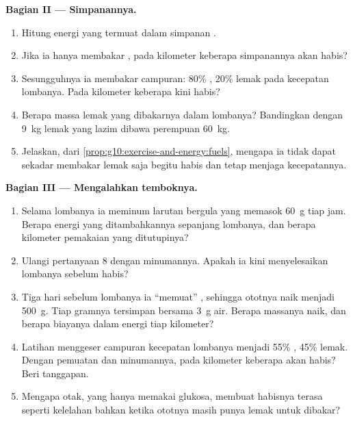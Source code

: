 \begin{problem}
\medskip
\noindent\textbf{Bagian II --- Simpanannya.}
\begin{enumerate}[resume]
  \item Hitung energi yang termuat dalam simpanan .
  \item Jika ia hanya membakar , pada kilometer keberapa
        simpanannya akan habis?
  \item Sesungguhnya ia membakar campuran: 80\% , 20\% lemak
        pada kecepatan lombanya. Pada kilometer keberapa 
        kini habis?
  \item Berapa massa lemak yang dibakarnya dalam lombanya? Bandingkan
        dengan \qty{9}{kg} lemak yang lazim dibawa perempuan \qty{60}{kg}.
  \item Jelaskan, dari \cref{prop:g10:exercise-and-energy:fuels},
        mengapa ia tidak dapat sekadar membakar lemak saja begitu
         habis dan tetap menjaga kecepatannya.
\end{enumerate}

\medskip
\noindent\textbf{Bagian III --- Mengalahkan temboknya.}
\begin{enumerate}[resume]
  \item Selama lombanya ia meminum larutan bergula yang memasok
        \qty{60}{g}  tiap jam. Berapa energi yang
        ditambahkannya sepanjang lombanya, dan berapa kilometer
        pemakaian  yang ditutupinya?
  \item Ulangi pertanyaan 8 dengan minumannya. Apakah ia kini
        menyelesaikan lombanya sebelum  habis?
  \item Tiga hari sebelum lombanya ia ``memuat'' , sehingga
         ototnya naik menjadi \qty{500}{g}. Tiap gramnya
        tersimpan bersama \qty{3}{g} air. Berapa massanya naik, dan
        berapa biayanya dalam energi tiap kilometer?
  \item Latihan menggeser campuran kecepatan lombanya menjadi 55\%
        , 45\% lemak. Dengan pemuatan dan minumannya, pada
        kilometer keberapa  akan habis? Beri tanggapan.
  \item Mengapa otak, yang hanya memakai glukosa, membuat habisnya
         terasa seperti kelelahan bahkan ketika ototnya masih
        punya lemak untuk dibakar?
\end{enumerate}


\end{problem}
